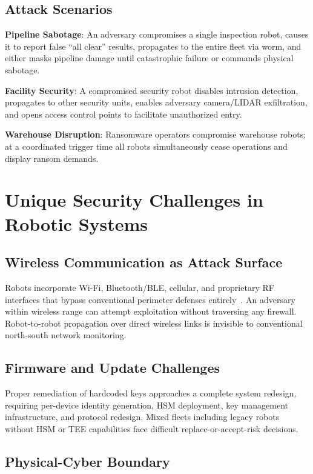\documentclass[journal]{IEEEtran}
\begin{document}
\subsection{Attack Scenarios}

\textbf{Pipeline Sabotage}: An adversary compromises a single inspection robot, causes
it to report false ``all clear'' results, propagates to the entire fleet via worm, and
either masks pipeline damage until catastrophic failure or commands physical sabotage.

\textbf{Facility Security}: A compromised security robot disables intrusion detection,
propagates to other security units, enables adversary camera/LIDAR exfiltration, and
opens access control points to facilitate unauthorized entry.

\textbf{Warehouse Disruption}: Ransomware operators compromise warehouse robots; at a
coordinated trigger time all robots simultaneously cease operations and display ransom
demands.

\section{Unique Security Challenges in Robotic Systems}

\subsection{Wireless Communication as Attack Surface}

Robots incorporate Wi-Fi, Bluetooth/BLE, cellular, and proprietary RF interfaces that
bypass conventional perimeter defenses entirely~\cite{udinmwen2025calm}. An adversary
within wireless range can attempt exploitation without traversing any firewall.
Robot-to-robot propagation over direct wireless links is invisible to conventional
north-south network monitoring.

\subsection{Firmware and Update Challenges}

Proper remediation of hardcoded keys approaches a complete system redesign, requiring
per-device identity generation, HSM deployment, key management infrastructure, and
protocol redesign. Mixed fleets including legacy robots without HSM or TEE capabilities
face difficult replace-or-accept-risk decisions.

\subsection{Physical-Cyber Boundary}
\end{document}
